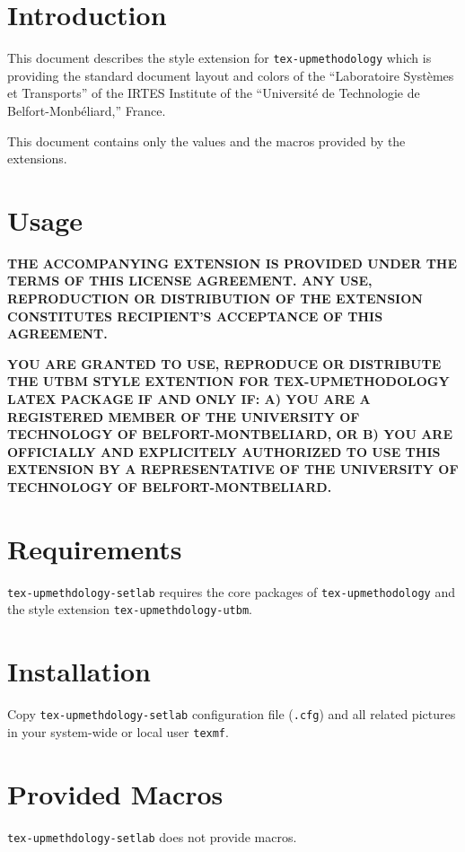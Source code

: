 \documentclass[article]{upmethodology-document}
\begin{document}
\section{Introduction}

This document describes the style extension for \texttt{tex-upmethodology} which is providing the standard document layout and colors of the ``Laboratoire Syst\`emes et Transports'' of the IRTES Institute of the ``Universit\'e de Technologie de Belfort-Monb\'eliard,'' France.

This document contains only the values and the macros provided by the extensions.

\section{Usage}

\textbf{THE ACCOMPANYING EXTENSION IS PROVIDED UNDER THE TERMS OF THIS LICENSE AGREEMENT. ANY USE, REPRODUCTION OR DISTRIBUTION OF THE EXTENSION CONSTITUTES RECIPIENT'S ACCEPTANCE OF THIS AGREEMENT.}

\textbf{YOU ARE GRANTED TO USE, REPRODUCE OR DISTRIBUTE THE UTBM STYLE EXTENTION FOR TEX-UPMETHODOLOGY LATEX PACKAGE IF AND ONLY IF: A) YOU ARE A REGISTERED MEMBER OF THE UNIVERSITY OF TECHNOLOGY OF BELFORT-MONTBELIARD, OR B) YOU ARE OFFICIALLY AND EXPLICITELY AUTHORIZED TO USE THIS EXTENSION BY A REPRESENTATIVE OF THE UNIVERSITY OF TECHNOLOGY OF BELFORT-MONTBELIARD.}

\section{Requirements}

\texttt{tex-upmethdology-setlab} requires the core packages of \texttt{tex-upmethodology} and the style extension \texttt{tex-upmethdology-utbm}.

\section{Installation}

Copy \texttt{tex-upmethdology-setlab} configuration file (\texttt{.cfg}) and all related pictures in your system-wide or local user \texttt{texmf}.

\section{Provided Macros}

\texttt{tex-upmethdology-setlab} does not provide macros.
\end{document}
